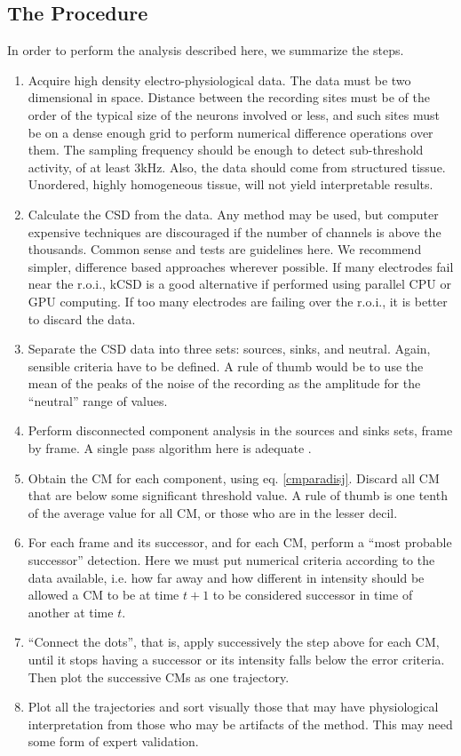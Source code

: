 \documentclass[11pt, letterpaper]{article}
\begin{document}
 \subsection{The Procedure}
 
 In order to perform the analysis described here, we summarize the steps.
 \begin{enumerate}
 \item Acquire high density electro-physiological data. The data must be two
   dimensional
   in space. Distance between the recording sites must be of the order of the typical
   size of the neurons involved or less, and such sites must be on a dense enough grid to perform numerical difference operations over them.
   The sampling frequency should be enough to detect sub-threshold activity,
   of at least 3kHz. Also, the data should come from structured tissue.
   Unordered, highly homogeneous tissue, will not yield interpretable results. 
 \item Calculate the CSD from the data. Any method may be used,
   but computer expensive techniques are discouraged if the
   number of channels is above the thousands.
   Common sense and tests are guidelines here.
   We recommend simpler, difference based approaches wherever possible.
   If many electrodes fail near the r.o.i.,
   kCSD is a good alternative if performed using
   parallel CPU or GPU computing.
   If too many electrodes are failing over the r.o.i.,
   it is better to discard the data. 
 \item Separate the CSD data into three sets: sources, sinks, and neutral.
   Again, sensible criteria have to be defined.
   A rule of thumb would be to use the mean of the peaks of the noise  of the recording as the amplitude for the ``neutral'' range of values. 
\item Perform disconnected component analysis in the sources and sinks sets, frame by frame.
  A single pass algorithm here is  adequate \cite{Vincent91, Abubaker07}.
\item  Obtain the CM for each component, using eq. \ref{cmparadisj}. Discard
  all CM that are below some significant threshold value. A rule of thumb is one tenth of the average value for all CM,
  or those who are in the lesser decil. 
\item For each frame and its successor, and for each CM, perform a ``most probable successor'' detection. Here we must put numerical criteria according to the data available, i.e. how far away and how different in intensity should be allowed a CM to be at time $t+1$ to be considered successor in time of another at time $t$.
\item ``Connect the dots'', that is, apply successively the step above for each CM, until it stops having a successor or its intensity falls below the error criteria. Then plot the successive CMs as one trajectory.
\item Plot all the trajectories and sort visually those that may have physiological interpretation from those who may be artifacts of the method. This may need some form of expert validation.
 \end{enumerate}
 
\end{document}
